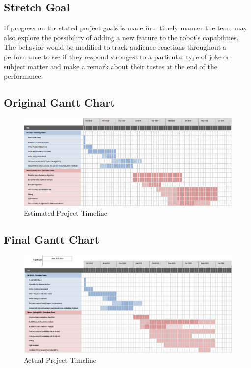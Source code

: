 \documentclass[onecolumn, draftclsnofoot,10pt, compsoc]{IEEEtran}
\begin{document}
\subsection{Stretch Goal}
If progress on the stated project goals is made in a timely manner the team may also explore the possibility of adding a new feature to the robot's capabilities. The behavior would be modified to track audience reactions throughout a performance to see if they respond strongest to a particular type of joke or subject matter and make a remark about their tastes at the end of the performance.

\newpage
\subsection{Original Gantt Chart}
\begin{figure}[ht]
\includegraphics[width=\linewidth]{gantt1.eps}
\caption{Estimated Project Timeline}
\end{figure}

\subsection{Final Gantt Chart}
\begin{figure}[ht]
\includegraphics[width=\linewidth]{gantt2.eps}
\caption{Actual Project Timeline}
\end{figure}
\end{document}

